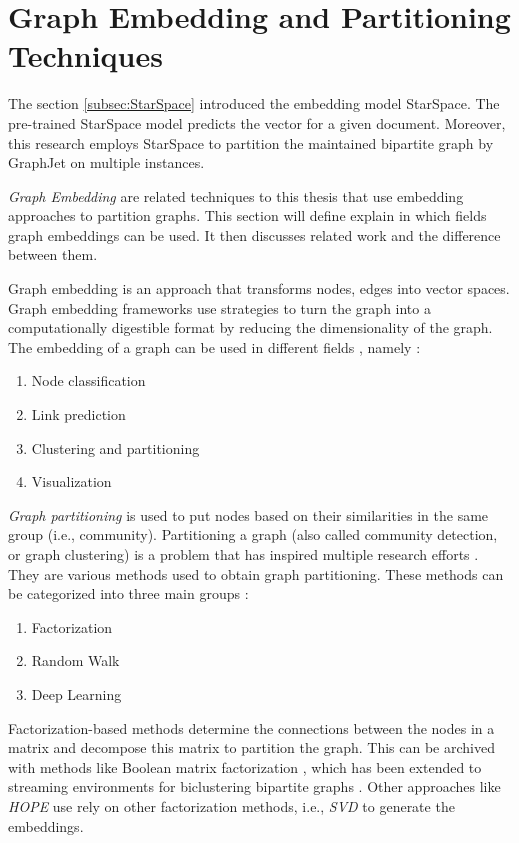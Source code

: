 \section{Graph Embedding and Partitioning Techniques}
\label{sec:graph-partitioning-techniques}
The section \ref{subsec:StarSpace} introduced the embedding model StarSpace. The pre-trained StarSpace model predicts the vector for a given document. Moreover, this research employs StarSpace to partition the maintained bipartite graph by GraphJet on multiple instances. 


\emph{Graph Embedding} are related techniques to this thesis that use embedding approaches to partition graphs. This section will define explain in which fields graph embeddings can be used. It then discusses related work and the difference between them.


Graph embedding is an approach that transforms nodes, edges into vector spaces. Graph embedding frameworks use strategies to turn the graph into a computationally digestible format by reducing the dimensionality of the graph. The embedding of a graph can be used in different fields \cite{goyalGraphEmbeddingTechniques2018}, namely : 

\begin{enumerate}
    \item Node classification
    \item Link prediction
    \item Clustering and partitioning
    \item Visualization
\end{enumerate}


\emph{Graph partitioning} is used to put nodes based on their similarities in the same group (i.e., community). Partitioning a graph (also called community detection, or graph clustering) is a problem that has inspired multiple research efforts \cite{fortunatoCommunityDetectionGraphs2010}. They are various methods used to obtain graph partitioning. These methods can be categorized into three main groups \cite{goyalGraphEmbeddingTechniques2018}:

\begin{enumerate}
    \item Factorization
    \item Random Walk
    \item Deep Learning
\end{enumerate}


Factorization-based methods determine the connections between the nodes in a matrix and decompose this matrix to partition the graph. This can be archived with methods like Boolean matrix factorization \cite{miettinenModelOrderSelection2011}, which has been extended to streaming environments for biclustering bipartite graphs \cite{neumannBiclusteringBooleanMatrix2020}. Other approaches like \emph{HOPE} \cite{ouAsymmetricTransitivityPreserving2016b} use rely on other factorization methods, i.e., \emph{SVD} \cite{vanloanGeneralizingSingularValue1976} to generate the embeddings.



